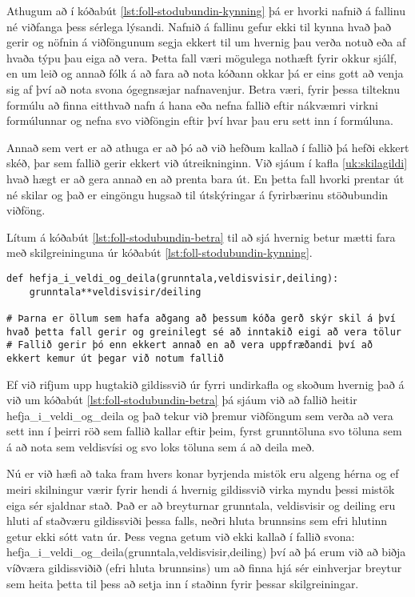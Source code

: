 Athugum að í kóðabút \ref{lst:foll-stodubundin-kynning} þá er hvorki nafnið á fallinu né viðfanga þess sérlega lýsandi.
Nafnið á fallinu gefur ekki til kynna hvað það gerir og nöfnin á viðföngunum segja ekkert til um hvernig þau verða notuð eða af hvaða týpu þau eiga að vera.
Þetta fall væri mögulega nothæft fyrir okkur sjálf, en um leið og annað fólk á að fara að nota kóðann okkar þá er eins gott að venja sig af því að nota svona ógegnsæjar nafnavenjur.
Betra væri, fyrir þessa tilteknu formúlu að finna eitthvað nafn á hana eða nefna fallið eftir nákvæmri virkni formúlunnar og nefna svo viðföngin eftir því hvar þau eru sett inn í formúluna.

Annað sem vert er að athuga er að þó að við hefðum kallað í fallið þá hefði ekkert skéð, þar sem fallið gerir ekkert við útreikninginn.
Við sjáum í kafla \ref{uk:skilagildi} hvað hægt er að gera annað en að prenta bara út.
En þetta fall hvorki prentar út né skilar og það er eingöngu hugsað til útskýringar á fyrirbærinu stöðubundin viðföng.

Lítum á kóðabút \ref{lst:foll-stodubundin-betra} til að sjá hvernig betur mætti fara með skilgreininguna úr kóðabút \ref{lst:foll-stodubundin-kynning}.

\begin{lstlisting}[caption=Stöðubundin viðföng kynnt, label=lst:foll-stodubundin-betra]
def hefja_i_veldi_og_deila(grunntala,veldisvisir,deiling):	
	grunntala**veldisvisir/deiling

# Þarna er öllum sem hafa aðgang að þessum kóða gerð skýr skil á því hvað þetta fall gerir og greinilegt sé að inntakið eigi að vera tölur
# Fallið gerir þó enn ekkert annað en að vera uppfræðandi því að ekkert kemur út þegar við notum fallið
\end{lstlisting}

Ef við rifjum upp hugtakið gildissvið úr fyrri undirkafla og skoðum hvernig það á við um kóðabút \ref{lst:foll-stodubundin-betra} þá sjáum við að fallið heitir hefja\_i\_veldi\_og\_deila og það tekur við þremur viðföngum sem verða að vera sett inn í þeirri röð sem fallið kallar eftir þeim, fyrst grunntöluna svo töluna sem á að nota sem veldisvísi og svo loks töluna sem á að deila með.

Nú er við hæfi að taka fram hvers konar byrjenda mistök eru algeng hérna og ef meiri skilningur værir fyrir hendi á hvernig gildissvið virka myndu þessi mistök eiga sér sjaldnar stað.
Það er að breyturnar grunntala, veldisvisir og deiling eru hluti af staðværu gildissviði þessa falls, neðri hluta brunnsins sem efri hlutinn getur ekki sótt vatn úr.
Þess vegna getum við ekki kallað í fallið svona: hefja\_i\_veldi\_og\_deila(grunntala,veldisvisir,deiling) því að þá erum við að biðja víðværa gildissviðið (efri hluta brunnsins) um að finna hjá sér einhverjar breytur sem heita þetta til þess að setja inn í staðinn fyrir þessar skilgreiningar.

